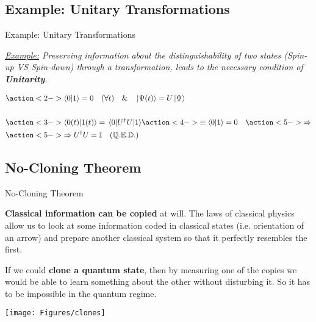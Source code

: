 \documentclass[9pt, handout, aspectratio=169]{beamer}	%
\begin{document}

\subsection{Example: Unitary Transformations}

\begin{frame}{Example: Unitary Transformations}

	\textit{\underline{Example:} Preserving information about the distinguishability of two states (Spin-up VS Spin-down) through a transformation, leads to the necessary condition of \textbf{Unitarity}.}

	\begin{align*}
		&\action<2->{ \braket{0}{1} =0 \quad (\forall t) \quad \& \quad \ket{\Psi (t)} = U\ket{\Psi} } \\
		 \\
		&\action<3->{ \braket{0(t)}{1(t)} = \mel{0}{U^\dagger U}{1} } \action<4->{ \equiv \braket{0}{1}=0 \quad } \action<5->{ \Rightarrow } \\
		&\action<5->{ \Rightarrow U^\dagger U = \mathbb{I} \quad \mathbb{(Q.E.D.)} }
	\end{align*}


\end{frame}



\subsection{No-Cloning Theorem}

\begin{frame}{No-Cloning Theorem}

	\textbf{Classical information can be copied} at will. The laws of classical physics allow us to look at some information coded in classical states (i.e. orientation of an arrow) and prepare another classical system so that it perfectly resembles the first.

	\begin{multicols}{2}

		If we could \textbf{clone a quantum state}, then by measuring one of the copies we would be able to learn something about the other without disturbing it. So it has to be impossible in the quantum regime.

		\columnbreak
		\begin{center}
	\texttt{[image: Figures/clones]}
		\end{center}

	\end{multicols}

\end{frame}
\end{document}

